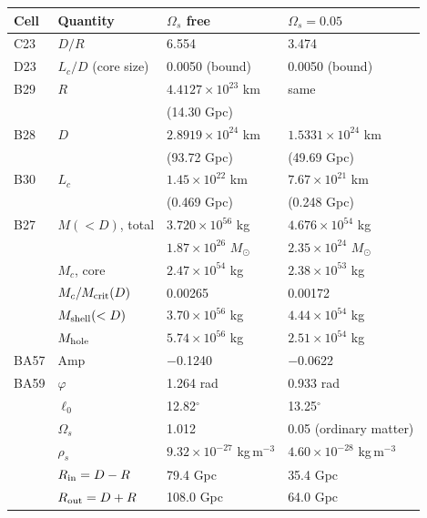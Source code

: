 \documentclass[10pt,letterpaper]{article}
\begin{document}
\begin{minipage}[t]{0.48\textwidth}\vspace{0pt}\centering\scriptsize\setlength{\tabcolsep}{2.2pt}\renewcommand{\arraystretch}{0.93}
\begin{tabular}{llll}\toprule
Cell & Quantity & $\Omega_s$ free & $\Omega_s=0.05$\\\midrule
C23 & $D/R$ & 6.554 & 3.474\\
D23 & $L_c/D$ (core size) & 0.0050 (bound) & 0.0050 (bound)\\
B29 & $R$ & $4.4127\times10^{23}$ km & same\\
 &  & (14.30 Gpc) & \\
B28 & $D$ & $2.8919\times10^{24}$ km & $1.5331\times10^{24}$ km\\
 &  & (93.72 Gpc) & (49.69 Gpc)\\
B30 & $L_c$ & $1.45\times10^{22}$ km & $7.67\times10^{21}$ km\\
 &  & (0.469 Gpc) & (0.248 Gpc)\\
B27 & $M(<D)$, total & $3.720\times10^{56}$ kg & $4.676\times10^{54}$ kg\\
 &  & $1.87\times10^{26}$ $M_\odot$ & $2.35\times10^{24}$ $M_\odot$\\
 & $M_c$, core & $2.47\times10^{54}$ kg & $2.38\times10^{53}$ kg\\
 & $M_c/M_{\rm crit}(D)$ & 0.00265 & 0.00172\\
 & $M_{\rm shell}(<D)$ & $3.70\times10^{56}$ kg & $4.44\times10^{54}$ kg\\
 & $M_{\rm hole}$ & $5.74\times10^{56}$ kg & $2.51\times10^{54}$ kg\\
BA57 & Amp & $-$0.1240 & $-$0.0622\\
BA59 & $\varphi$ & 1.264 rad & 0.933 rad\\
 & $\ell_0$ & 12.82$^\circ$ & 13.25$^\circ$\\
\midrule
 & $\Omega_s$ & 1.012 & 0.05 (ordinary matter)\\
 & $\rho_s$ & $9.32\times10^{-27}$ kg\,m$^{-3}$ & $4.60\times10^{-28}$ kg\,m$^{-3}$\\
 & $R_{\rm in}=D-R$ & 79.4 Gpc & 35.4 Gpc\\
 & $R_{\rm out}=D+R$ & 108.0 Gpc & 64.0 Gpc\\

\end{tabular}
\end{minipage}
\end{document}
